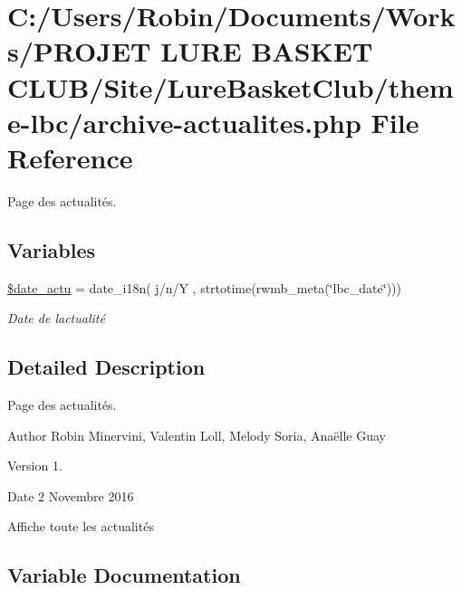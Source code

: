 \hypertarget{archive-actualites_8php}{}\section{C\+:/\+Users/\+Robin/\+Documents/\+Works/\+P\+R\+O\+J\+ET L\+U\+RE B\+A\+S\+K\+ET C\+L\+U\+B/\+Site/\+Lure\+Basket\+Club/theme-\/lbc/archive-\/actualites.php File Reference}
\label{archive-actualites_8php}


Page des actualités.  


\subsection*{Variables}
\begin{DoxyCompactItemize}
\item 
\hyperlink{archive-actualites_8php_a52de04bff06bbb25ae5ec592b62ffa7d}{\$date\+\_\+actu} = date\+\_\+i18n(\textquotesingle{} j/n/Y \textquotesingle{}, strtotime(rwmb\+\_\+meta(\char`\"{}lbc\+\_\+date\char`\"{})))
\begin{DoxyCompactList}\small\item\em Date de l\textquotesingle{}actualité \end{DoxyCompactList}\end{DoxyCompactItemize}


\subsection{Detailed Description}
Page des actualités. 

\begin{DoxyAuthor}{Author}
Robin Minervini, Valentin Loll, Melody Soria, Anaëlle Guay 
\end{DoxyAuthor}
\begin{DoxyVersion}{Version}
1. 
\end{DoxyVersion}
\begin{DoxyDate}{Date}
2 Novembre 2016
\end{DoxyDate}
Affiche toute les actualités 

\subsection{Variable Documentation}
\hypertarget{archive-actualites_8php_a52de04bff06bbb25ae5ec592b62ffa7d}{}\label{archive-actualites_8php_a52de04bff06bbb25ae5ec592b62ffa7d} 
